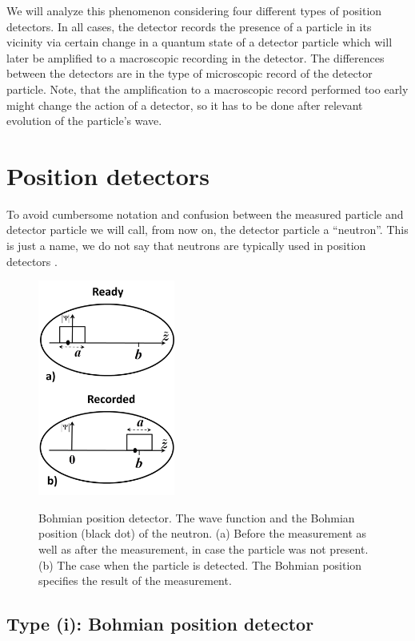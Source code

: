 \documentclass[12pt,preprint,tightenlines]{elsarticle}
\begin{document}
We will analyze this phenomenon considering
four different types of position detectors. In all cases, the detector
records the presence of a particle in its vicinity  via certain change
in a quantum state of a detector particle which will later be amplified
to a macroscopic recording in the detector. The differences between
the detectors are in the type of microscopic record of the detector
particle. Note, that  the amplification to a macroscopic record performed too early  might change the action of  a detector, so it has to be done after relevant evolution of the particle's wave.


\section{ Position detectors}

To avoid cumbersome notation and confusion between the measured particle
and detector particle we will call, from now on, the detector particle
a ``neutron''. This is just a name, we do not say that  neutrons are typically used in position detectors .



\begin{figure}[H]
  \includegraphics[width=4.5cm]{3.pdf}\\ \vspace{-6pt}
    \caption{ Bohmian position detector. The wave function  and the Bohmian position (black dot) of the neutron. (a)    Before the measurement as well as after the measurement, in case the particle was not present. (b) The case when the particle is detected. The Bohmian position specifies the result of the measurement.}
\end{figure}



\subsection{ Type {\rm (i)}: Bohmian position detector}
\end{document}
